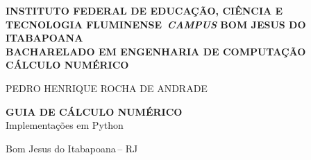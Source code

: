 \providecommand{\instituicao}{Instituto Federal de Educação, Ciência e Tecnologia Fluminense}
\providecommand{\campus}{\textit{Campus} Bom Jesus do Itabapoana}
\providecommand{\curso}{Bacharelado em Engenharia de Computação}
\providecommand{\disciplinaFormatada}{Cálculo Numérico}
\providecommand{\aluno}{Pedro Henrique Rocha de Andrade}
\providecommand{\titulo}{Guia de Cálculo Numérico}
\providecommand{\subtitulo}{Implementações em Python}
\providecommand{\local}{Bom Jesus do Itabapoana}
\providecommand{\estado}{RJ}
\providecommand{\ano}{\the\year}

\begin{center}
\thispagestyle{empty}

{\normalsize\bfseries\MakeUppercase{\instituicao \, \campus \\ \curso \\ \disciplinaFormatada}}

\vspace{6\baselineskip} %

{\normalsize\MakeUppercase{\aluno}}

\vspace{12\baselineskip} %

{\normalsize\bfseries\MakeUppercase{\titulo}\\}
{\normalsize \subtitulo}

\vfill %

{\normalsize \local \,-- \estado \\
\ano}

\end{center}